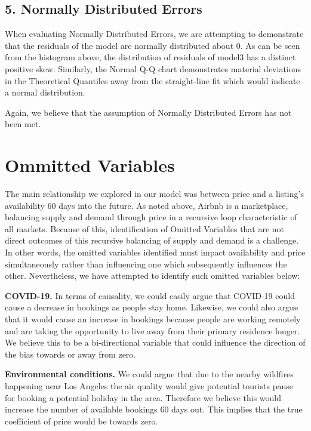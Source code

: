\documentclass[
]{article}
\begin{document}
\hypertarget{normally-distributed-errors}{%
\subsection{\texorpdfstring{\textbf{5. Normally Distributed Errors}}{5. Normally Distributed Errors}}\label{normally-distributed-errors}}

When evaluating Normally Distributed Errors, we are attempting to demonstrate that the residuals of the model are normally distributed about 0. As can be seen from the histogram above, the distribution of residuals of model3 has a distinct positive skew. Similarly, the Normal Q-Q chart demonstrates material deviations in the Theoretical Quantiles away from the straight-line fit which would indicate a normal distribution.

Again, we believe that the assumption of Normally Distributed Errors has not been met.

\hypertarget{ommitted-variables}{%
\section{Ommitted Variables}\label{ommitted-variables}}

The main relationship we explored in our model was between price and a listing's availability 60 days into the future. As noted above, Airbnb is a marketplace, balancing supply and demand through price in a recursive loop characteristic of all markets. Because of this, identification of Omitted Variables that are not direct outcomes of this recursive balancing of supply and demand is a challenge. In other words, the omitted variables identified must impact availability and price simultaneously rather than influencing one which subsequently influences the other.
Nevertheless, we have attempted to identify such omitted variables below:

\textbf{COVID-19.} In terms of causality, we could easily argue that COVID-19 could cause a decrease in bookings as people stay home. Likewise, we could also argue that it would cause an increase in bookings because people are working remotely and are taking the opportunity to live away from their primary residence longer. We believe this to be a bi-directional variable that could influence the direction of the bias towards or away from zero.

\textbf{Environmental conditions.} We could argue that due to the nearby wildfires happening near Los Angeles the air quality would give potential tourists pause for booking a potential holiday in the area. Therefore we believe this would increase the number of available bookings 60 days out. This implies that the true coefficient of price would be towards zero.
\end{document}
